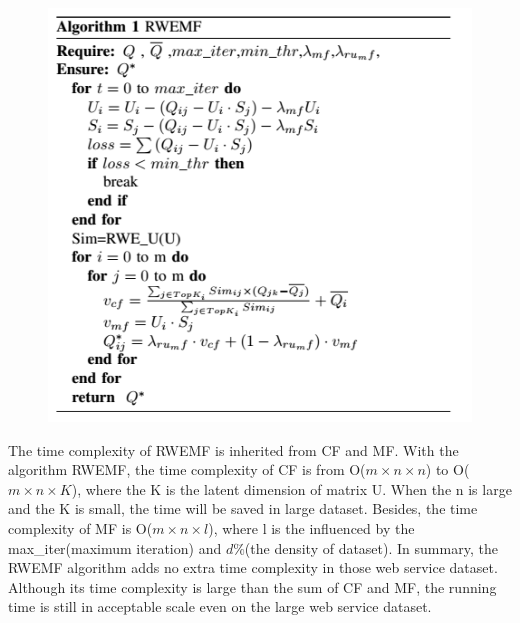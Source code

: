 \documentclass[conference]{IEEEtran}
\begin{document}
\begin{figure}[H]
    \includegraphics[width=0.45\paperwidth]{alg1.png}
    \end{figure}
 
\par The time complexity of RWEMF is inherited from CF and MF. With the algorithm RWEMF, the time complexity of CF is from O($m \times n \times n$) to O($m \times n \times K$), where the K is the latent dimension of matrix U. When the n is large and the K is small, the time will be saved in large dataset. Besides, the time complexity of MF is O($m \times n \times l$), where l is the influenced by the max\_iter(maximum iteration) and $d \%$(the density of dataset). In summary, the RWEMF algorithm adds no extra time complexity in those web service dataset. Although its time complexity is large than the sum of CF and MF, the running time\cite{wang_collaborative_2015} is still in acceptable scale even on the large web service dataset.
\end{document}
